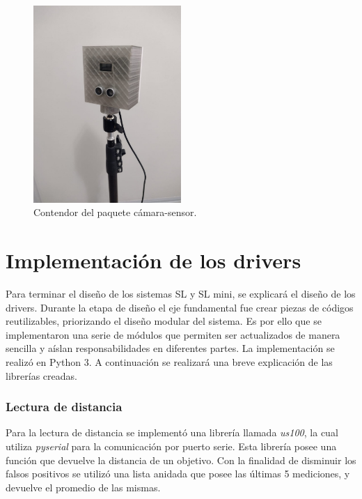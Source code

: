 \begin{figure}[bth]
    \centering
    \includegraphics[width=0.5\textwidth]{imgs/contenedor-real.jpeg}
    \caption{Contendor del paquete cámara-sensor.}
    \label{fig:contenedor-camara-real}
\end{figure}

\section{Implementación de los drivers}

Para terminar el diseño de los sistemas SL y SL mini, se explicará el diseño de los drivers. Durante la etapa de diseño el eje fundamental fue crear piezas de códigos reutilizables, priorizando el diseño modular del sistema.
Es por ello que se implementaron una serie de módulos que permiten ser actualizados de manera sencilla y aíslan responsabilidades en diferentes partes. La implementación se realizó en Python 3. A continuación se realizará una breve explicación de las librerías creadas.


\subsubsection{Lectura de distancia}

Para la lectura de distancia se implementó una librería llamada \textit{us100}, la cual utiliza \textit{pyserial}  \cite{noauthor_documentacion_nodate-1} para la comunicación por puerto serie.
Esta librería posee una función que devuelve la distancia de un objetivo. Con la finalidad de disminuir los falsos positivos se utilizó una lista anidada que posee las últimas 5 mediciones, y devuelve el promedio de las mismas.

